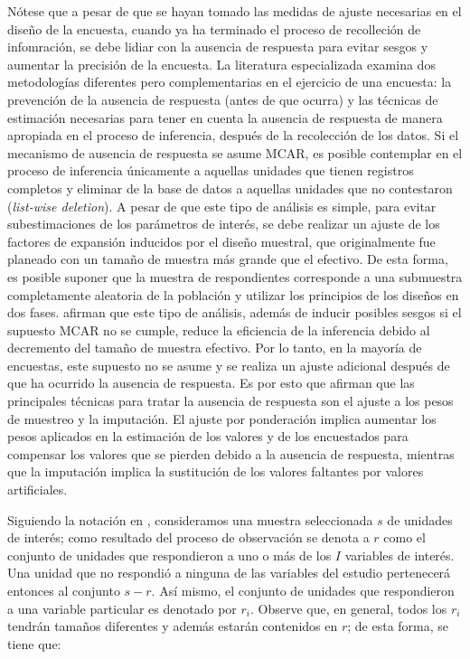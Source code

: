 \documentclass[12pt,spanish,]{book}
\begin{document}
Nótese que a pesar de que se hayan tomado las medidas de ajuste necesarias en el diseño de la encuesta, cuando ya ha terminado el proceso de recolleción de infomración, se debe lidiar con la ausencia de respuesta para evitar sesgos y aumentar la precisión de la encuesta. La literatura especializada examina dos metodologías diferentes pero complementarias en el ejercicio de una encuesta: la prevención de la ausencia de respuesta (antes de que ocurra) y las técnicas de estimación necesarias para tener en cuenta la ausencia de respuesta de manera apropiada en el proceso de inferencia, después de la recolección de los datos. Si el mecanismo de ausencia de respuesta se asume MCAR, es posible contemplar en el proceso de inferencia únicamente a aquellas unidades que tienen registros completos y eliminar de la base de datos a aquellas unidades que no contestaron (\emph{list-wise deletion}). A pesar de que este tipo de análisis es simple, para evitar subestimaciones de los parámetros de interés, se debe realizar un ajuste de los factores de expansión inducidos por el diseño muestral, que originalmente fue planeado con un tamaño de muestra más grande que el efectivo. De esta forma, es posible suponer que la muestra de respondientes corresponde a una submuestra completamente aleatoria de la población y utilizar los principios de los diseños en dos fases. \textcite[capítulo 11]{Heeringa_West_Berglund_2010} afirman que este tipo de análisis, además de inducir posibles sesgos si el supuesto MCAR no se cumple, reduce la eficiencia de la inferencia debido al decremento del tamaño de muestra efectivo. Por lo tanto, en la mayoría de encuestas, este supuesto no se asume y se realiza un ajuste adicional después de que ha ocurrido la ausencia de respuesta. Es por esto que \textcite[sección 15.5]{Sarndal_Swensson_Wretman_2003} afirman que las principales técnicas para tratar la ausencia de respuesta son el ajuste a los pesos de muestreo y la imputación. El ajuste por ponderación implica aumentar los pesos aplicados en la estimación de los valores y de los encuestados para compensar los valores que se pierden debido a la ausencia de respuesta, mientras que la imputación implica la sustitución de los valores faltantes por valores artificiales.

Siguiendo la notación en \textcite{Sarndal_Lundstrom_2006}, consideramos una muestra seleccionada \(s\) de unidades de interés; como resultado del proceso de observación se denota a \(r\) como el conjunto de unidades que respondieron a uno o más de los \(I\) variables de interés. Una unidad que no respondió a ninguna de las variables del estudio pertenecerá entonces al conjunto \(s−r\). Así mismo, el conjunto de unidades que respondieron a una variable particular es denotado por \(r_i\). Observe que, en general, todos los \(r_i\) tendrán tamaños diferentes y además estarán contenidos en \(r\); de esta forma, se tiene que:
\end{document}

